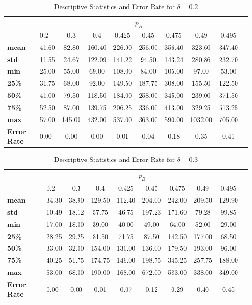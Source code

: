 \documentclass[magisterska, english]{pwr_wmat_praca_dyplomowa}
\theoremstyle{plain}
\numberwithin{theorem}{chapter}
\theoremstyle{definition}
\numberwithin{theorem}{chapter}
\begin{document}
\begin{table}[H]
	\centering
	\caption{Descriptive Statistics and Error Rate for \( \delta = 0.2 \)}
	\label{tab:descriptive_stats_delta_02}
	\begin{tabular}{llcccccccc}
		\toprule
		& \multicolumn{8}{c}{$p_B$} \\ \cmidrule(lr){2-9}
		& 0.2 & 0.3 & 0.4 & 0.425 & 0.45 & 0.475 & 0.49 & 0.495 \\
		\midrule
		\textbf{mean} & 41.60 & 82.80 & 160.40 & 226.90 & 256.00 & 356.40 & 323.60 & 347.40 \\
		\textbf{std} & 11.55 & 24.67 & 122.09 & 141.22 & 94.50 & 143.24 & 280.86 & 232.70 \\
		\textbf{min} & 25.00 & 55.00 & 69.00 & 108.00 & 84.00 & 105.00 & 97.00 & 53.00 \\
		\textbf{25\%} & 31.75 & 68.00 & 92.00 & 149.50 & 187.75 & 308.00 & 155.50 & 122.50 \\
		\textbf{50\%} & 41.00 & 79.50 & 118.50 & 184.00 & 258.00 & 345.00 & 239.00 & 371.50 \\
		\textbf{75\%} & 52.50 & 87.00 & 139.75 & 206.25 & 336.00 & 413.00 & 329.25 & 513.25 \\
		\textbf{max} & 57.00 & 145.00 & 432.00 & 537.00 & 363.00 & 590.00 & 1032.00 & 705.00 \\
		\textbf{Error Rate} & 0.00 & 0.00 & 0.00 & 0.01 & 0.04 & 0.18 & 0.35 & 0.41 \\
		\bottomrule
	\end{tabular}
\end{table}

\begin{table}[H]
	\centering
	\caption{Descriptive Statistics and Error Rate for \( \delta = 0.3 \)}
	\label{tab:descriptive_stats_delta_03}
	\begin{tabular}{llcccccccc}
		\toprule
		& \multicolumn{8}{c}{$p_B$} \\ \cmidrule(lr){2-9}
		& 0.2 & 0.3 & 0.4 & 0.425 & 0.45 & 0.475 & 0.49 & 0.495 \\
		\midrule
		\textbf{mean} & 34.30 & 38.90 & 129.50 & 112.40 & 204.00 & 242.00 & 209.50 & 129.90 \\
		\textbf{std} & 10.49 & 18.12 & 57.75 & 46.75 & 197.23 & 171.60 & 79.28 & 99.85 \\
		\textbf{min} & 17.00 & 18.00 & 39.00 & 40.00 & 49.00 & 64.00 & 52.00 & 29.00 \\
		\textbf{25\%} & 28.25 & 29.25 & 81.50 & 71.75 & 87.50 & 142.50 & 177.00 & 68.50 \\
		\textbf{50\%} & 33.00 & 32.00 & 154.00 & 130.00 & 136.00 & 179.50 & 193.00 & 96.00 \\
		\textbf{75\%} & 40.25 & 51.75 & 174.75 & 149.00 & 198.75 & 345.25 & 257.75 & 188.00 \\
		\textbf{max} & 53.00 & 68.00 & 190.00 & 168.00 & 672.00 & 583.00 & 338.00 & 349.00 \\
		\textbf{Error Rate} & 0.00 & 0.00 & 0.01 & 0.07 & 0.12 & 0.29 & 0.40 & 0.45 \\
		\bottomrule
	\end{tabular}
\end{table}
\end{document}
